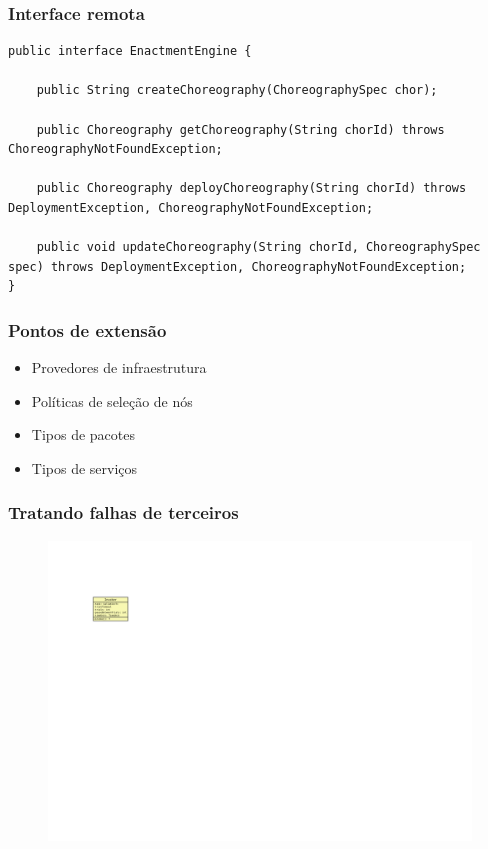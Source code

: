 \documentclass{beamer}
\begin{document}
\begin{frame}[fragile]
\frametitle{Interface remota}

\begin{block}{}
{\scriptsize
\begin{lstlisting}[breaklines]
public interface EnactmentEngine {

    public String createChoreography(ChoreographySpec chor);

    public Choreography getChoreography(String chorId) throws ChoreographyNotFoundException;

    public Choreography deployChoreography(String chorId) throws DeploymentException, ChoreographyNotFoundException;

    public void updateChoreography(String chorId, ChoreographySpec spec) throws DeploymentException, ChoreographyNotFoundException;
}
\end{lstlisting}
}
\end{block}


\end{frame}


\begin{frame}
\frametitle{Pontos de extensão}

\begin{itemize}
\item Provedores de infraestrutura
\item Políticas de seleção de nós
\item Tipos de pacotes
\item Tipos de serviços
\end{itemize}

\end{frame}


\begin{frame}
\frametitle{Tratando falhas de terceiros}

\begin{figure}
\includegraphics[width=0.4\linewidth]{img/invoker}
\end{figure}

\end{frame}
\end{document}
